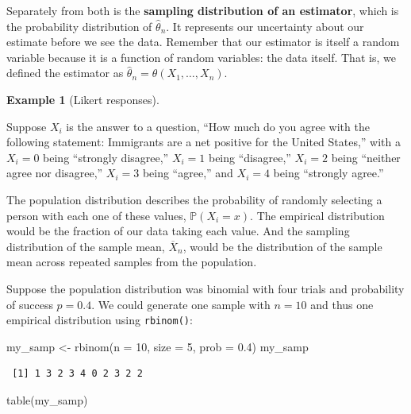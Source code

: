 \documentclass[
  letterpaper,
  DIV=11,
  numbers=noendperiod]{scrreprt}
\newenvironment{Shaded}{\begin{snugshade}}{\end{snugshade}}
\newcommand{\AttributeTok}[1]{\textcolor[rgb]{0.40,0.45,0.13}{#1}}
\newcommand{\DecValTok}[1]{\textcolor[rgb]{0.68,0.00,0.00}{#1}}
\newcommand{\FloatTok}[1]{\textcolor[rgb]{0.68,0.00,0.00}{#1}}
\newcommand{\FunctionTok}[1]{\textcolor[rgb]{0.28,0.35,0.67}{#1}}
\newcommand{\NormalTok}[1]{\textcolor[rgb]{0.00,0.23,0.31}{#1}}
\newcommand{\OtherTok}[1]{\textcolor[rgb]{0.00,0.23,0.31}{#1}}
\renewcommand{\P}{\mathbb{P}}
\newcommand{\Xbar}{\overline{X}}
\theoremstyle{definition}
\newtheorem{example}{Example}[chapter]
\theoremstyle{definition}
\theoremstyle{plain}
\theoremstyle{remark}
\begin{document}
Separately from both is the \textbf{sampling distribution of an
estimator}, which is the probability distribution of
\(\widehat{\theta}_n\). It represents our uncertainty about our estimate
before we see the data. Remember that our estimator is itself a random
variable because it is a function of random variables: the data itself.
That is, we defined the estimator as
\(\widehat{\theta}_n = \theta(X_1, \ldots, X_n)\).

\begin{example}[Likert
responses]\protect\hypertarget{exm-three-dist}{}\label{exm-three-dist}

Suppose \(X_i\) is the answer to a question, ``How much do you agree
with the following statement: Immigrants are a net positive for the
United States,'' with a \(X_i = 0\) being ``strongly disagree,''
\(X_i = 1\) being ``disagree,'' \(X_i = 2\) being ``neither agree nor
disagree,'' \(X_i = 3\) being ``agree,'' and \(X_i = 4\) being
``strongly agree.''

The population distribution describes the probability of randomly
selecting a person with each one of these values, \(\P(X_i = x)\). The
empirical distribution would be the fraction of our data taking each
value. And the sampling distribution of the sample mean, \(\Xbar_n\),
would be the distribution of the sample mean across repeated samples
from the population.

Suppose the population distribution was binomial with four trials and
probability of success \(p = 0.4\). We could generate one sample with
\(n = 10\) and thus one empirical distribution using \texttt{rbinom()}:

\begin{Shaded}
\begin{Highlighting}[]
\NormalTok{my\_samp }\OtherTok{\textless{}{-}} \FunctionTok{rbinom}\NormalTok{(}\AttributeTok{n =} \DecValTok{10}\NormalTok{, }\AttributeTok{size =} \DecValTok{5}\NormalTok{, }\AttributeTok{prob =} \FloatTok{0.4}\NormalTok{)}
\NormalTok{my\_samp}
\end{Highlighting}
\end{Shaded}

\begin{verbatim}
 [1] 1 3 2 3 4 0 2 3 2 2
\end{verbatim}

\begin{Shaded}
\begin{Highlighting}[]
\FunctionTok{table}\NormalTok{(my\_samp)}
\end{Highlighting}
\end{Shaded}


\end{example}
\end{document}

